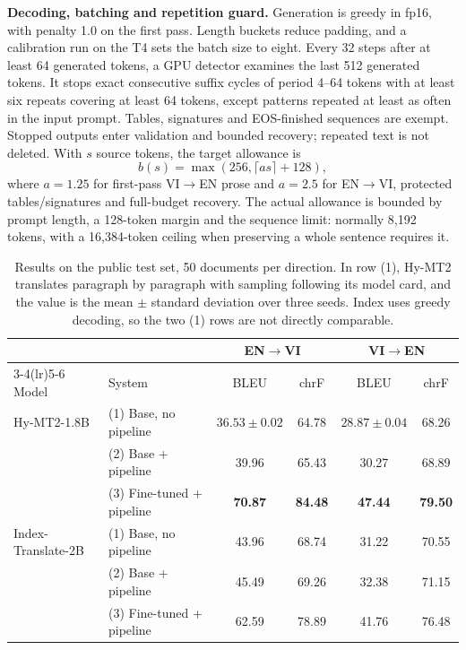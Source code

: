 \documentclass[11pt]{article}
\newcommand{\envi}{EN$\rightarrow$VI}
\newcommand{\vien}{VI$\rightarrow$EN}
\begin{document}
\textbf{Decoding, batching and repetition guard.} Generation is greedy in fp16, with penalty 1.0 on the first pass. Length buckets reduce padding, and a calibration run on the T4 sets the batch size to eight. Every 32 steps after at least 64 generated tokens, a GPU detector examines the last 512 generated tokens. It stops exact consecutive suffix cycles of period 4--64 tokens with at least six repeats covering at least 64 tokens, except patterns repeated at least as often in the input prompt. Tables, signatures and EOS-finished sequences are exempt. Stopped outputs enter validation and bounded recovery; repeated text is not deleted. With $s$ source tokens, the target allowance is
\begin{equation}
b(s)=\max(256,\lceil a s\rceil+128),
\label{eq:budget}
\end{equation}
where $a=1.25$ for first-pass \vien{} prose and $a=2.5$ for \envi{}, protected tables/signatures and full-budget recovery. The actual allowance is bounded by prompt length, a 128-token margin and the sequence limit: normally 8,192 tokens, with a 16,384-token ceiling when preserving a whole sentence requires it.

\begin{table}[t]
\centering
\begin{tabular}{llcccc}
\toprule
 & & \multicolumn{2}{c}{\envi{}} & \multicolumn{2}{c}{\vien{}} \\
\cmidrule(lr){3-4}\cmidrule(lr){5-6}
Model & System & BLEU & chrF & BLEU & chrF \\
\midrule
Hy-MT2-1.8B & (1) Base, no pipeline & $36.53 \pm 0.02$ & 64.78 & $28.87 \pm 0.04$ & 68.26 \\
 & (2) Base + pipeline & 39.96 & 65.43 & 30.27 & 68.89 \\
 & (3) Fine-tuned + pipeline & \textbf{70.87} & \textbf{84.48} & \textbf{47.44} & \textbf{79.50} \\
\midrule
Index-Translate-2B & (1) Base, no pipeline & 43.96 & 68.74 & 31.22 & 70.55 \\
 & (2) Base + pipeline & 45.49 & 69.26 & 32.38 & 71.15 \\
 & (3) Fine-tuned + pipeline & 62.59 & 78.89 & 41.76 & 76.48 \\
\bottomrule
\end{tabular}
\caption{Results on the public test set, 50 documents per direction. In row (1), Hy-MT2 translates paragraph by paragraph with sampling following its model card, and the value is the mean $\pm$ standard deviation over three seeds. Index uses greedy decoding, so the two (1) rows are not directly comparable.}
\label{tab:main}
\end{table}
\end{document}
